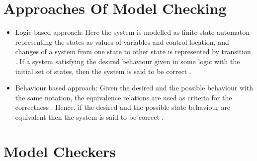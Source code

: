\documentclass[a4paper,12pt]{report}
\begin{document}
\section{Approaches Of Model Checking}
\label{Appr to model check}

\begin{itemize}
\item Logic based approach: Here the system is modelled as finite-state automaton representing the states as values of variables and control location, and changes of a system from one state to other state is represented by transition \cite{DanielJackson2004}. If a system satisfying the desired behaviour given in some logic with the initial set of states, then the system is said to be correct \cite{DanielJackson2004}.
\item Behaviour based approach: Given the desired and the possible behaviour with the same notation, the equivalence relations are used as criteria for the correctness \cite{DanielJackson2004}. Hence, if the desired and the possible state behaviour are equivalent then the system is said to be correct \cite{DanielJackson2004}.  
\end{itemize}

\section{Model Checkers}
\end{document}
